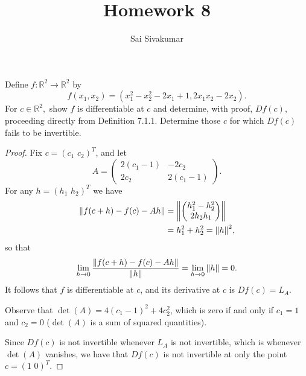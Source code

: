 \documentclass[12pt]{amsart}
\title{Homework 8}
\author{Sai Sivakumar}
\newcommand{\RR}{\mathbb{R}}
\begin{document}
\maketitle

Define $f:\RR^2\to \RR^2$ by 
\[
 f(x_1,x_2) = (x_1^2-x_2^2-2x_1+1, 2x_1x_2-2x_2).
\]
 For $c\in \RR^2,$ show $f$ is differentiable at $c$ and determine, with proof,
 $Df(c),$ proceeding directly from Definition 7.1.1.
 Determine those $c$ for which  $Df(c)$ fails to be invertible.


\bigskip

\begin{proof}
Fix $c = (c_1 \,\, c_2)^T$, and let \[A = \begin{pmatrix}
    2(c_1-1) & -2c_2 \\ 2c_2 & 2(c_1-1)
\end{pmatrix}.\] For any $h = (h_1\,\,h_2)^T$ we have \begin{align*}
    \norm{f(c+h) - f(c) - Ah} &= \norm{\begin{pmatrix}
        h_1^2 - h_2^2 \\ 2 h_2 h_1
    \end{pmatrix}} \\
    &= h_1^2+h_2^2 = \norm{h}^2,
\end{align*} so that \[\lim_{h\to 0} \frac{\norm{f(c+h) - f(c) - Ah}}{\norm{h}} = \lim_{h\to 0}\norm{h} = 0.\] It follows that $f$ is differentiable at $c$, and its derivative at $c$ is $Df(c) = L_A$.

Observe that $\det(A) = 4(c_1-1)^2 + 4c_2^2$, which is zero if and only if $c_1 = 1$ and $c_2 = 0$ ($\det(A)$ is a sum of squared quantities).

Since $Df(c)$ is not invertible whenever $L_A$ is not invertible, which is whenever $\det(A)$ vanishes, we have that $Df(c)$ is not invertible at only the point $c = (1 \,\, 0)^T$.
\end{proof}
\end{document}
